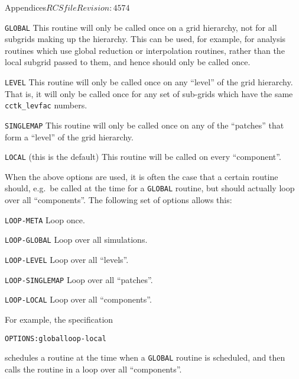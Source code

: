 \begin{cactuspart}{Appendices}{$RCSfile$}{$Revision: 4574 $}
\begin{Lentry}
\item[{\tt GLOBAL}] This routine will only be called once on a grid
  hierarchy, not for all subgrids making up the hierarchy.  This can
  be used, for example, for analysis routines which use global
  reduction or interpolation routines, rather than the local subgrid
  passed to them, and hence should only be called once.
  
\item[{\tt LEVEL}] This routine will only be called once on any
  ``level'' of the grid hierarchy.  That is, it will only be called
  once for any set of sub-grids which have the same
  \texttt{cctk\_levfac} numbers.
  
\item[{\tt SINGLEMAP}] This routine will only be called once on any of
  the ``patches'' that form a ``level'' of the grid hierarchy.
  
\item[{\tt LOCAL} (this is the default)] This routine will be called
  on every ``component''.

\end{Lentry}

When the above options are used, it is often the case that a certain
routine should, e.g.\ be called at the time for a \texttt{GLOBAL}
routine, but should actually loop over all ``components''.  The
following set of options allows this:

\begin{Lentry}
  
\item[{\tt LOOP-META}] Loop once.
  
\item[{\tt LOOP-GLOBAL}] Loop over all simulations.
  
\item[{\tt LOOP-LEVEL}] Loop over all ``levels''.
  
\item[{\tt LOOP-SINGLEMAP}] Loop over all ``patches''.
  
\item[{\tt LOOP-LOCAL}] Loop over all ``components''.

\end{Lentry}

For example, the specification
\begin{alltt}
  OPTIONS: global loop-local
\end{alltt}
schedules a routine at the time when a \texttt{GLOBAL} routine is
scheduled, and then calls the routine in a loop over all
``components''.



\end{cactuspart}
